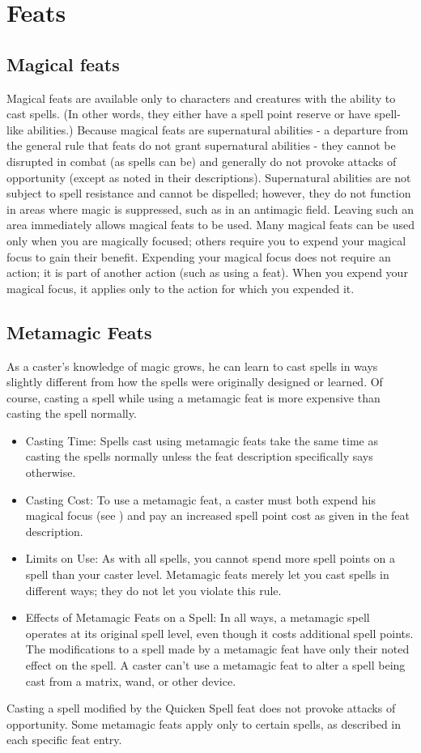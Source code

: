 \section{Feats}
\subsection{Magical feats}
Magical feats are available only to characters and creatures with the ability to cast spells. 
(In other words, they either have a spell point reserve or have spell-like abilities.)
Because magical feats are supernatural abilities - a departure from the general rule that feats do not grant supernatural abilities - 
they cannot be disrupted in combat (as spells can be) and generally do not provoke attacks of opportunity (except as noted in their descriptions). 
Supernatural abilities are not subject to spell resistance and cannot be dispelled; however, they do not function in areas where magic is suppressed, 
such as in an antimagic field. Leaving such an area immediately allows magical feats to be used.
Many magical feats can be used only when you are magically focused; others require you to expend your magical focus to gain their benefit. 
Expending your magical focus does not require an action; it is part of another action (such as using a feat). 
When you expend your magical focus, it applies only to the action for which you expended it.

\subsection{Metamagic Feats}
As a caster's knowledge of magic grows, he can learn to cast spells in ways slightly different from how the spells were originally designed or learned. 
Of course, casting a spell while using a metamagic feat is more expensive than casting the spell normally.
\begin{itemize}
\item Casting Time:
Spells cast using metamagic feats take the same time as casting the spells normally unless the feat description specifically says otherwise.
\item Casting Cost:
To use a metamagic feat, a caster must both expend his magical focus (see ) 
and pay an increased spell point cost as given in the feat description.
\item Limits on Use: 
As with all spells, you cannot spend more spell points on a spell than your caster level. 
Metamagic feats merely let you cast spells in different ways; they do not let you violate this rule. 
\item Effects of Metamagic Feats on a Spell: 
In all ways, a metamagic spell operates at its original spell level, even though it costs additional spell points. 
The modifications to a spell made by a metamagic feat have only their noted effect on the spell. 
A caster can't use a metamagic feat to alter a spell being cast from a matrix, wand, or other device.
\end{itemize}
Casting a spell modified by the Quicken Spell feat does not provoke attacks of opportunity.
Some metamagic feats apply only to certain spells, as described in each specific feat entry.

